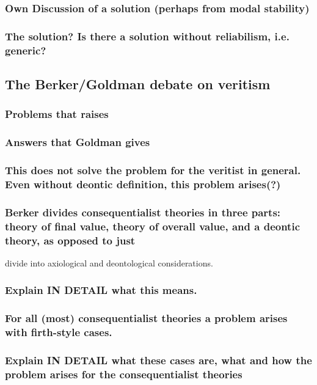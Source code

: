 \documentclass[12pt,numbers=noenddot]{scrartcl}
\begin{document}
\subsubsection{ Own Discussion of a solution (perhaps from modal stability)}
\subsubsection{ The solution? Is there a solution without reliabilism, i.e. generic?}


\subsection{The Berker/Goldman debate on veritism}

\subsubsection{ Problems that \textcite{Berker2013-BERETA-2} raises}
\subsubsection{ Answers that Goldman gives}
\subsubsection{ This does not solve the problem for the veritist in general. Even without deontic definition, this problem arises(?)}
\subsubsection{ Berker divides consequentialist theories in three parts: theory of final value, theory of overall value, and a deontic theory, as opposed to just }divide into axiological and deontological considerations. 
\subsubsection{ Explain IN DETAIL what this means. }
\subsubsection{ For all (most) consequentialist theories a problem arises with firth-style cases. }
\subsubsection{ Explain IN DETAIL what these cases are, what and how the problem arises for the consequentialist theories}
\end{document}
